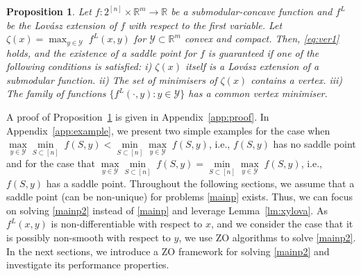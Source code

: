 \documentclass{article}
\theoremstyle{plain}
\newtheorem{proposition}[theorem]{Proposition}
\theoremstyle{definition}
\theoremstyle{remark}
\newcommand{\R}{\mathbb{R}}
\begin{document}
\begin{proposition}\label{Prp:sadex}
    Let $f:2^{[n]}\times\R^m\rightarrow \mathbb{R}$ be a submodular-concave function and $f^L$ be the Lovász extension of $f$ with respect to the first variable. Let 
    $\zeta(x) = \max_{y \in \mathcal{Y}}\;f^L(x,y)$ 
    for $\mathcal{Y}\subset \R^m$ convex and compact. Then, \eqref{eq:ver1} %
    holds, and the existence of a saddle point for $f$ is guaranteed if one of the following conditions is satisfied: i)  $\zeta(x)$ itself is a Lovász extension of a submodular function. ii) The set of minimisers of $\zeta(x)$ contains a vertex. iii) The family of functions $\{f^L(\cdot,y):y\in\mathcal{Y}\}$ has a common
    vertex minimiser.
\end{proposition}
A proof of Proposition~\ref{Prp:sadex} is given in Appendix~\ref{app:proof}.
In Appendix~\ref{app:example}, we present two simple examples for the case when 
$\underset{y \in \mathcal{Y}}{\max}\underset{S \subset [n] }{\min}\;f(S,y)<\underset{S \subset [n] }{\min}\underset{y \in \mathcal{Y}}{\max}\;f(S,y)$, i.e., 
$f(S,y)$ has no saddle point and for the case that $\underset{y \in \mathcal{Y}}{\max}\underset{S \subset [n] }{\min}\;f(S,y)=\underset{S \subset [n] }{\min}\underset{y \in \mathcal{Y}}{\max}\;f(S,y)$, i.e.,
$f(S,y)$ has a saddle point. 
Throughout the following
sections, we assume that a saddle point (can be non-unique) for problems \eqref{mainp} %
exists. Thus, we can focus on solving \eqref{mainp2} instead of \eqref{mainp} and leverage Lemma~\ref{lm:xylova}. %
As $f^L(x,y)$ is non-differentiable with respect to $x$, and we consider the case that it is possibly non-smooth with respect to $y$, we use ZO algorithms %
to solve \eqref{mainp2}. In the next sections, we introduce a ZO framework for solving \eqref{mainp2} and investigate its 
performance properties.
\end{document}
